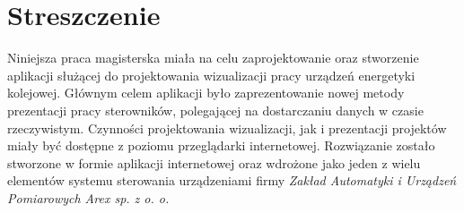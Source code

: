 \chapter*{Streszczenie}

Niniejsza praca magisterska miała na celu zaprojektowanie oraz stworzenie aplikacji służącej do projektowania wizualizacji pracy urządzeń energetyki kolejowej. Głównym celem aplikacji było zaprezentowanie nowej metody prezentacji pracy sterowników, polegającej na dostarczaniu danych w czasie rzeczywistym. Czynności projektowania wizualizacji, jak i prezentacji projektów miały być dostępne z poziomu przeglądarki internetowej.
Rozwiązanie zostało stworzone w formie aplikacji internetowej oraz wdrożone jako jeden z wielu elementów systemu sterowania urządzeniami firmy \textit{Zakład Automatyki i Urządzeń Pomiarowych Arex sp. z o. o.} 
